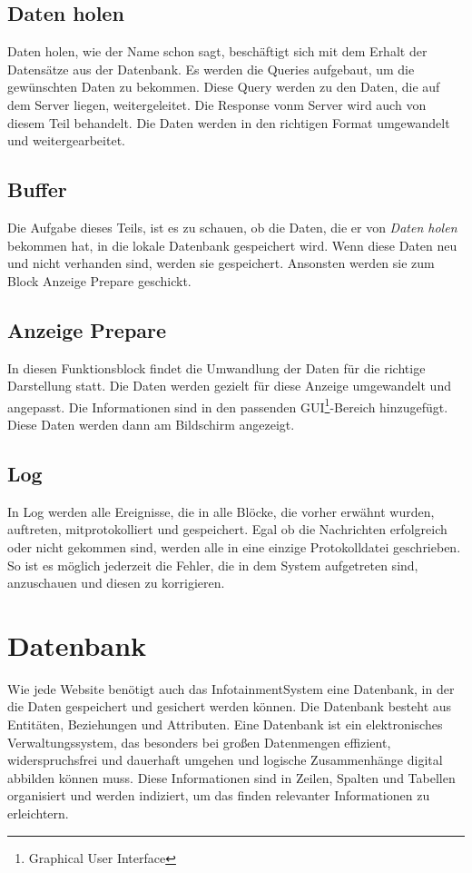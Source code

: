 \subsection{Daten holen}
Daten holen, wie der Name schon sagt, beschäftigt sich mit dem Erhalt der Datensätze aus der Datenbank. Es werden die Queries aufgebaut, um die gewünschten Daten zu bekommen. Diese Query werden zu den Daten, die auf dem Server liegen, weitergeleitet. Die Response vonm Server wird auch von diesem Teil behandelt. Die Daten werden in den richtigen Format umgewandelt und weitergearbeitet.



\subsection{Buffer}
Die Aufgabe dieses Teils, ist es zu schauen, ob die Daten, die er von \textit{Daten holen} bekommen hat, in die lokale Datenbank gespeichert wird. Wenn diese Daten neu und nicht verhanden sind, werden sie gespeichert. Ansonsten werden sie zum Block Anzeige Prepare geschickt.

\subsection{Anzeige Prepare}
In diesen Funktionsblock findet die Umwandlung der Daten für die richtige Darstellung statt. Die Daten werden gezielt für diese Anzeige umgewandelt und angepasst. Die Informationen sind in den passenden GUI\footnote{Graphical User Interface}-Bereich hinzugefügt. Diese Daten werden dann am Bildschirm angezeigt.

\subsection{Log}
In Log werden alle Ereignisse, die in alle Blöcke, die vorher erwähnt wurden, auftreten, mitprotokolliert und gespeichert.  Egal ob die Nachrichten erfolgreich oder nicht gekommen sind, werden alle in eine einzige Protokolldatei geschrieben. So ist es möglich jederzeit die Fehler, die in dem System aufgetreten sind, anzuschauen und diesen zu korrigieren.

\section{Datenbank}
Wie jede Website benötigt auch das InfotainmentSystem eine Datenbank, in der die Daten gespeichert und gesichert werden können. Die Datenbank besteht aus Entitäten, Beziehungen und Attributen. Eine Datenbank ist ein elektronisches Verwaltungssystem, das besonders bei großen Datenmengen effizient, widerspruchsfrei und dauerhaft umgehen und logische Zusammenhänge digital abbilden können muss. Diese Informationen sind in Zeilen, Spalten und Tabellen organisiert und werden indiziert, um das finden relevanter Informationen zu erleichtern.

